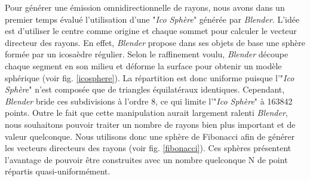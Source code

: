 Pour générer une émission omnidirectionnelle de rayons, nous avons dans un premier temps évalué l'utilisation d'une "\textit{Ico Sphère}" générée par \textit{Blender}. L'idée est d'utiliser le centre comme origine et chaque sommet pour calculer le vecteur directeur des rayons. En effet, \textit{Blender} propose dans ses objets de base une sphère formée par un icosaèdre régulier. Selon le raffinement voulu, \textit{Blender} découpe chaque segment en son milieu et déforme la surface pour obtenir un modèle sphérique (voir fig. \ref{icosphere}). La répartition est donc uniforme puisque l'"\textit{Ico Sphère}" n'est composée que de triangles équilatéraux identiques. Cependant, \textit{Blender} bride ces subdivisions à l'ordre 8, ce qui limite l'"\textit{Ico Sphère}" à 163842 points. Outre le fait que cette manipulation aurait largement ralenti \textit{Blender}, nous souhaitons pouvoir traiter un nombre de rayons bien plus important et de valeur quelconque. Nous utilisons donc une sphère de Fibonacci afin de générer les vecteurs directeurs des rayons (voir fig. \ref{fibonacci}). Ces sphères présentent l'avantage de pouvoir être construites avec un nombre quelconque N de point répartis quasi-uniformément.
%
